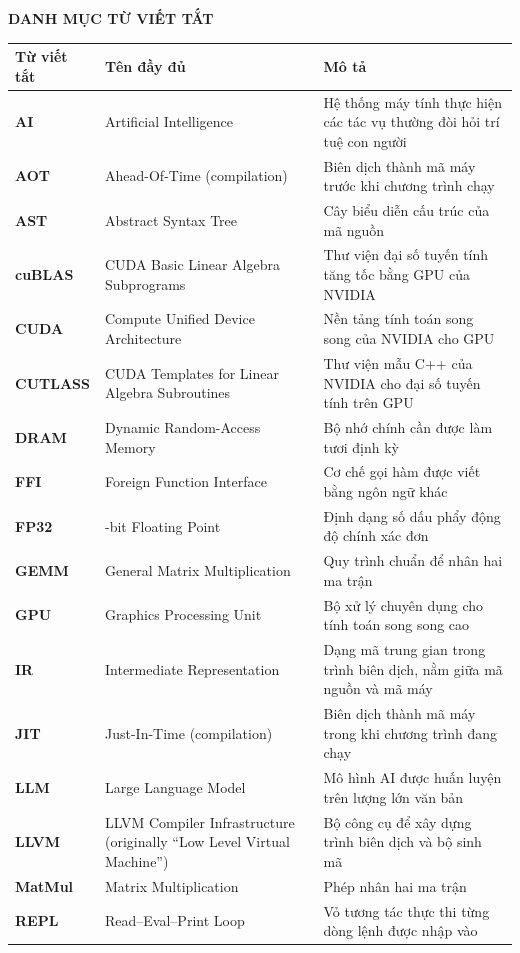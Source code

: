 \documentclass[a4paper]{article}
\begin{document}
    \vspace{10cm}
	\vspace{18pt}
	\begin{center}
		\textbf{DANH MỤC TỪ VIẾT TẮT}
	\end{center}
	\vspace{-6pt}
	\begin{center}
		\renewcommand{\arraystretch}{1.15}
		\begin{tabular}{>{\bfseries}l >{\raggedright\arraybackslash}p{5.8cm} >{\raggedright\arraybackslash}p{5.8cm}}
			\toprule
			\textbf{Từ viết tắt} & \textbf{Tên đầy đủ} & \textbf{Mô tả} \\
			\midrule
			AI      & Artificial Intelligence & Hệ thống máy tính thực hiện các tác vụ thường đòi hỏi trí tuệ con người \\
			AOT     & Ahead-Of-Time (compilation) & Biên dịch thành mã máy trước khi chương trình chạy \\
			AST     & Abstract Syntax Tree & Cây biểu diễn cấu trúc của mã nguồn \\
			cuBLAS  & CUDA Basic Linear Algebra Subprograms & Thư viện đại số tuyến tính tăng tốc bằng GPU của NVIDIA \\
			CUDA    & Compute Unified Device Architecture & Nền tảng tính toán song song của NVIDIA cho GPU \\
			CUTLASS & CUDA Templates for Linear Algebra Subroutines & Thư viện mẫu C++ của NVIDIA cho đại số tuyến tính trên GPU \\
			DRAM    & Dynamic Random-Access Memory & Bộ nhớ chính cần được làm tươi định kỳ \\
			FFI     & Foreign Function Interface & Cơ chế gọi hàm được viết bằng ngôn ngữ khác \\
			FP32    & 32-bit Floating Point & Định dạng số dấu phẩy động độ chính xác đơn \\
			GEMM    & General Matrix Multiplication & Quy trình chuẩn để nhân hai ma trận \\
			GPU     & Graphics Processing Unit & Bộ xử lý chuyên dụng cho tính toán song song cao \\
			IR      & Intermediate Representation & Dạng mã trung gian trong trình biên dịch, nằm giữa mã nguồn và mã máy \\
			JIT     & Just-In-Time (compilation) & Biên dịch thành mã máy trong khi chương trình đang chạy \\
			LLM     & Large Language Model & Mô hình AI được huấn luyện trên lượng lớn văn bản \\
			LLVM    & LLVM Compiler Infrastructure (originally ``Low Level Virtual Machine'') & Bộ công cụ để xây dựng trình biên dịch và bộ sinh mã \\
			MatMul  & Matrix Multiplication & Phép nhân hai ma trận \\
			REPL    & Read--Eval--Print Loop & Vỏ tương tác thực thi từng dòng lệnh được nhập vào \\
			\bottomrule
		\end{tabular}
	\end{center}
	
\end{document}

